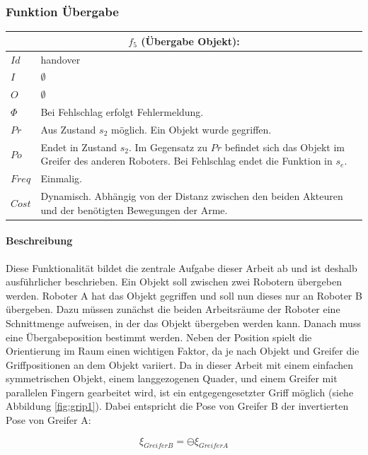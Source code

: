 \subsubsection{Funktion Übergabe}
\label{fun:han}
\begin{tabular}{|p{3cm}|p{10cm}|}
	\multicolumn{2}{c}{$f_5$ (Übergabe Objekt):}\\
	\hline  $Id$ & handover\\ 
	\hline  $I$ & $\emptyset$ \\ 
	\hline  $O$ & $\emptyset$ \\ 
	\hline  $\Phi$ & Bei Fehlschlag erfolgt Fehlermeldung.\\ 
	\hline $Pr$ & Aus Zustand $s_2$ möglich. Ein Objekt wurde gegriffen.  \\ 
	\hline $Po$ & Endet in Zustand $s_2$. Im Gegensatz zu $Pr$ befindet sich das Objekt im Greifer des anderen Roboters. Bei Fehlschlag endet die Funktion in $s_e$.\\ 
	\hline $Freq$ & Einmalig.\\ 
	\hline $Cost$ & Dynamisch. Abhängig von der Distanz zwischen den beiden Akteuren und der benötigten Bewegungen der Arme. \\
	\hline
\end{tabular} 

\paragraph{Beschreibung}
Diese Funktionalität bildet die zentrale Aufgabe dieser Arbeit ab und ist deshalb ausführlicher beschrieben. Ein Objekt soll zwischen zwei Robotern übergeben werden. Roboter A hat das Objekt gegriffen und soll nun dieses nur an Roboter B übergeben. Dazu müssen zunächst die beiden Arbeitsräume der Roboter eine Schnittmenge aufweisen, in der das Objekt übergeben werden kann. Danach muss eine Übergabeposition bestimmt werden. Neben der Position spielt die Orientierung im Raum einen wichtigen Faktor, da je nach Objekt und Greifer die Griffpositionen an dem Objekt variiert. Da in dieser Arbeit mit einem einfachen symmetrischen Objekt, einem langgezogenen Quader, und einem Greifer mit parallelen Fingern gearbeitet wird, ist ein entgegengesetzter Griff möglich (siehe Abbildung \ref{fig:grip1}). Dabei entspricht die Pose von Greifer B der invertierten Pose von Greifer A:

\begin{equation}
\xi_{GreiferB} = \ominus \xi_{GreiferA}
\label{eq:grip}
\end{equation}


